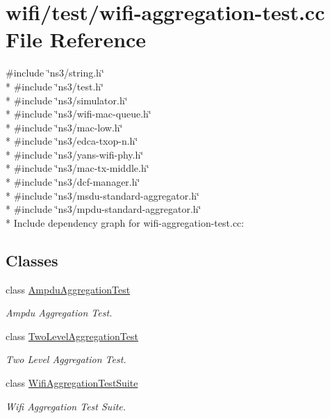 \hypertarget{wifi-aggregation-test_8cc}{}\section{wifi/test/wifi-\/aggregation-\/test.cc File Reference}
\label{wifi-aggregation-test_8cc}
{\ttfamily \#include \char`\"{}ns3/string.\+h\char`\"{}}\\*
{\ttfamily \#include \char`\"{}ns3/test.\+h\char`\"{}}\\*
{\ttfamily \#include \char`\"{}ns3/simulator.\+h\char`\"{}}\\*
{\ttfamily \#include \char`\"{}ns3/wifi-\/mac-\/queue.\+h\char`\"{}}\\*
{\ttfamily \#include \char`\"{}ns3/mac-\/low.\+h\char`\"{}}\\*
{\ttfamily \#include \char`\"{}ns3/edca-\/txop-\/n.\+h\char`\"{}}\\*
{\ttfamily \#include \char`\"{}ns3/yans-\/wifi-\/phy.\+h\char`\"{}}\\*
{\ttfamily \#include \char`\"{}ns3/mac-\/tx-\/middle.\+h\char`\"{}}\\*
{\ttfamily \#include \char`\"{}ns3/dcf-\/manager.\+h\char`\"{}}\\*
{\ttfamily \#include \char`\"{}ns3/msdu-\/standard-\/aggregator.\+h\char`\"{}}\\*
{\ttfamily \#include \char`\"{}ns3/mpdu-\/standard-\/aggregator.\+h\char`\"{}}\\*
Include dependency graph for wifi-\/aggregation-\/test.cc\+:
\subsection*{Classes}
\begin{DoxyCompactItemize}
\item 
class \hyperlink{classAmpduAggregationTest}{Ampdu\+Aggregation\+Test}
\begin{DoxyCompactList}\small\item\em Ampdu Aggregation Test. \end{DoxyCompactList}\item 
class \hyperlink{classTwoLevelAggregationTest}{Two\+Level\+Aggregation\+Test}
\begin{DoxyCompactList}\small\item\em Two Level Aggregation Test. \end{DoxyCompactList}\item 
class \hyperlink{classWifiAggregationTestSuite}{Wifi\+Aggregation\+Test\+Suite}
\begin{DoxyCompactList}\small\item\em Wifi Aggregation Test Suite. \end{DoxyCompactList}\end{DoxyCompactItemize}
